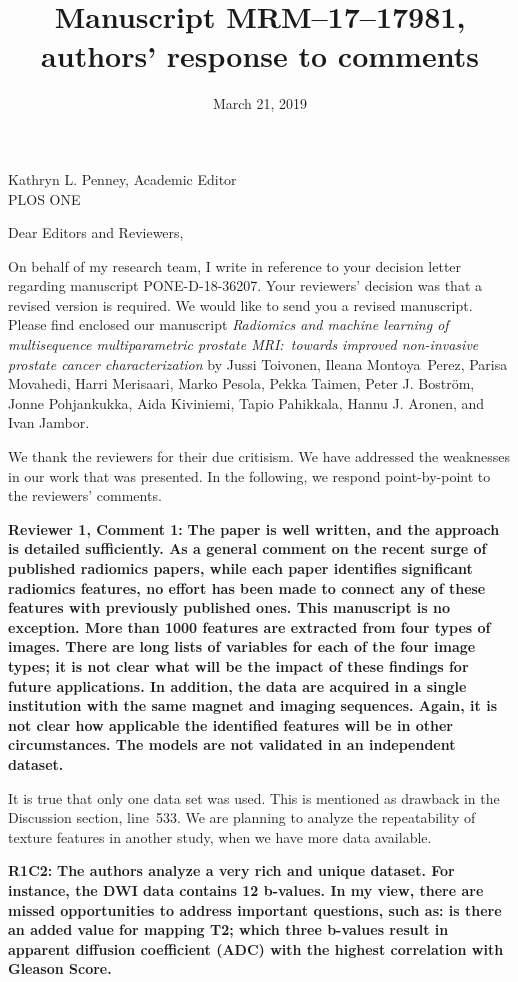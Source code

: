 \documentclass{letter}
\title{Manuscript MRM--17--17981, authors' response to comments}
\date{March 21, 2019}
\newenvironment{comment}[1]%
  {\vspace{5ex}\par\textbf{#1:}\ignorespaces\bfseries}%
  {\par\ignorespacesafterend}
\newenvironment{reply}%
  {\vspace{2ex}\par}%
  {\par\upshape}
\begin{document}
\begin{letter}{Kathryn L. Penney, Academic Editor \\ PLOS ONE}
\opening{Dear Editors and Reviewers,}

On behalf of my research team, I write in reference to your decision letter
regarding manuscript PONE-D-18-36207. Your reviewers' decision was that a
revised version is required. We would like to send you a revised manuscript.
Please find enclosed our manuscript \emph{Radiomics and machine learning of
multisequence multiparametric prostate MRI:\ towards improved non-invasive
prostate cancer characterization} by Jussi Toivonen, Ileana Montoya~Perez,
Parisa Movahedi, Harri Merisaari, Marko Pesola, Pekka Taimen, Peter J. Boström,
Jonne Pohjankukka, Aida Kiviniemi, Tapio Pahikkala, Hannu J. Aronen, and Ivan
Jambor.

We thank the reviewers for their due critisism. We have addressed the weaknesses
in our work that was presented. In the following, we respond point-by-point to
the reviewers' comments.


\begin{comment}{Reviewer 1, Comment 1}
The paper is well written, and the approach is detailed sufficiently. As a
general comment on the recent surge of published radiomics papers, while each
paper identifies significant radiomics features, no effort has been made to
connect any of these features with previously published ones. This manuscript is
no exception. More than 1000 features are extracted from four types of images.
There are long lists of variables for each of the four image types; it is not
clear what will be the impact of these findings for future applications. In
addition, the data are acquired in a single institution with the same magnet and
imaging sequences. Again, it is not clear how applicable the identified features
will be in other circumstances. The models are not validated in an independent
dataset.
\end{comment}

\begin{reply}
It is true that only one data set was used. This is mentioned as drawback in the
Discussion section, line~533. We are planning to analyze the repeatability of
texture features in another study, when we have more data available.
\end{reply}


\begin{comment}{R1C2}
The authors analyze a very rich and unique dataset. For instance, the DWI data
contains 12 b-values. In my view, there are missed opportunities to address
important questions, such as: is there an added value for mapping T2; which
three b-values result in apparent diffusion coefficient (ADC) with the highest
correlation with Gleason Score.
\end{comment}


\end{letter}
\end{document}
